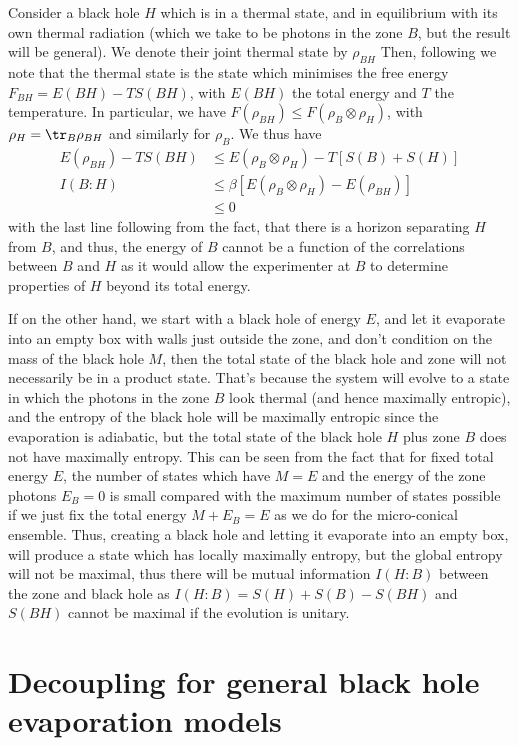 \documentclass[12pt,a4paper]{article}
\begin{document}
Consider a black hole $H$ which is in a thermal state, and in equilibrium with its own thermal radiation (which we take to be photons in the zone $B$, but the result will be general).
We denote their joint thermal state by $\rho_{BH}$ Then, following \cite{wolf2008area} we note that the thermal state is the state which minimises the free energy $F_{BH}=E(BH)-TS(BH)$, with $E(BH)$ the total energy and $T$ the temperature. In particular, we have $F(\rho_{BH})\leq F(\rho_B\otimes\rho_H)$, with $\rho_H=\tr_B\rho_{BH}$ and similarly for $\rho_B$. We thus have
\begin{align}
E(\rho_{BH})-TS(BH)&\leq E(\rho_B\otimes\rho_H)-T[S(B)+S(H)]\nonumber\\
I(B:H)&\leq\beta [E(\rho_B\otimes\rho_H)-E(\rho_{BH})]\nonumber\\
&\leq 0
\end{align}
with the last line following from the fact, that there is a horizon separating $H$ from $B$, and thus, the energy of $B$ cannot be a function of the correlations between $B$ and $H$ as it would allow the experimenter at $B$ to determine properties of $H$ beyond its total energy.

If on the other hand, we start with a black hole of energy $E$, and let it evaporate into an empty box with walls just outside the zone, and don't condition on the mass of the black hole $M$, then the total state of the black hole and zone will not necessarily be in a product state. That's because the system will evolve to a state in which the photons in the zone $B$ look thermal (and hence maximally entropic), and the entropy of the black hole will be maximally entropic since the evaporation is adiabatic, but the total state of the black hole $H$ plus zone $B$ does not have maximally entropy. This can be seen from the fact that for fixed total energy $E$, the number of states which have $M=E$ and the energy of the zone photons $E_B=0$ is small compared with the maximum number of states possible if we just fix the total energy $M+E_B=E$ as we do for the micro-conical ensemble. Thus, creating a black hole and letting it evaporate into an empty box, will produce a state which has locally maximally entropy, but the global entropy will not be maximal, thus there will be mutual information $I(H:B)$ between the zone and black hole as $I(H:B)=S(H) + S(B)-S(BH)$ and $S(BH)$ cannot be maximal if the evolution is unitary. 

\section{Decoupling for general black hole evaporation models}
\label{sec:general}
\end{document}
